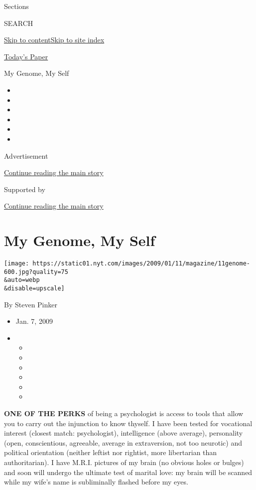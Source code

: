 Sections

SEARCH

\protect\hyperlink{site-content}{Skip to
content}\protect\hyperlink{site-index}{Skip to site index}

\href{https://myaccount.nytimes.com/auth/login?response_type=cookie\&client_id=vi}{}

\href{https://www.nytimes.com/section/todayspaper}{Today's Paper}

My Genome, My Self

\begin{itemize}
\item
\item
\item
\item
\item
\item
\end{itemize}

Advertisement

\protect\hyperlink{after-top}{Continue reading the main story}

Supported by

\protect\hyperlink{after-sponsor}{Continue reading the main story}

\hypertarget{my-genome-my-self}{%
\section{My Genome, My Self}\label{my-genome-my-self}}

\texttt{[image: https://static01.nyt.com/images/2009/01/11/magazine/11genome-600.jpg?quality=75\\\&auto=webp\\\&disable=upscale]}

By Steven Pinker

\begin{itemize}
\item
  Jan. 7, 2009
\item
  \begin{itemize}
  \item
  \item
  \item
  \item
  \item
  \item
  \end{itemize}
\end{itemize}

\textbf{ONE OF THE PERKS} of being a psychologist is access to tools
that allow you to carry out the injunction to know thyself. I have been
tested for vocational interest (closest match: psychologist),
intelligence (above average), personality (open, conscientious,
agreeable, average in extraversion, not too neurotic) and political
orientation (neither leftist nor rightist, more libertarian than
authoritarian). I have M.R.I. pictures of my brain (no obvious holes or
bulges) and soon will undergo the ultimate test of marital love: my
brain will be scanned while my wife's name is subliminally flashed
before my eyes.

